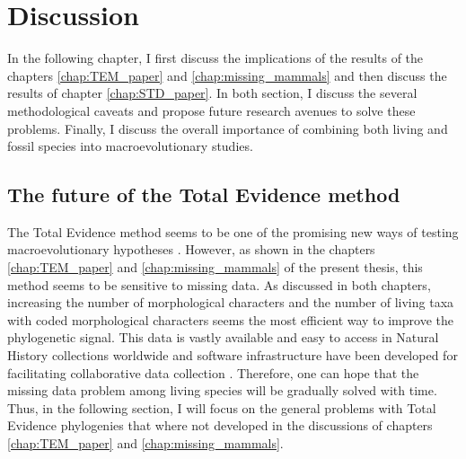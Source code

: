\chapter{Discussion}
\label{chap:discussion}

%
% 

In the following chapter, I first discuss the implications of the results of the chapters \ref{chap:TEM_paper} and \ref{chap:missing_mammals} and then discuss the results of chapter \ref{chap:STD_paper}.
In both section, I discuss the several methodological caveats and propose future research avenues to solve these problems.
Finally, I discuss the overall importance of combining both living and fossil species into macroevolutionary studies.

\section{The future of the Total Evidence method}
The Total Evidence method seems to be one of the promising new ways of testing macroevolutionary hypotheses \citep[e.g.][]{ronquista2012,slaterphylogenetic2013,Wood01032013,beckancient2014,Dembo2015}.
However, as shown in the chapters \ref{chap:TEM_paper} and \ref{chap:missing_mammals} of the present thesis, this method seems to be sensitive to missing data.
As discussed in both chapters, increasing the number of morphological characters and the number of living taxa with coded morphological characters seems the most efficient way to improve the phylogenetic signal.
This data is vastly available and easy to access in Natural History collections worldwide and software infrastructure have been developed for facilitating collaborative data collection \citep{morphobank}.
Therefore, one can hope that the missing data problem among living species will be gradually solved with time.
Thus, in the following section, I will focus on the general problems with Total Evidence phylogenies that where not developed in the discussions of chapters \ref{chap:TEM_paper} and \ref{chap:missing_mammals}. 

